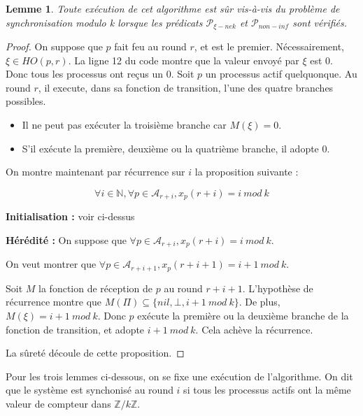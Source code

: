 \documentclass{article}
\newtheorem{lemma}{Lemme}
\begin{document}
\begin{lemma}
	Toute exécution de cet algorithme est sûr vis-à-vis du problème de synchronisation modulo k lorsque les prédicats $\mathcal{P}_{\xi-nek}$ et $\mathcal{P}_{non-inf}$ sont vérifiés.
\end{lemma}
\begin{proof}

	On suppose que $p$ fait feu au round $r$, et est le premier. Nécessairement, $\xi \in HO(p,r)$.
	La ligne 12 du code montre que la valeur envoyé par $\xi$ est 0.
	Donc tous les processus ont reçus un 0. Soit $p$ un processus actif quelquonque. Au round $r$, il execute, dans sa fonction de transition, l'une des quatre branches possibles.
	\begin{itemize}

		\item Il ne peut pas exécuter la troisième branche car $M(\xi) = 0$.
		\item S'il exécute la première, deuxième ou la quatrième branche, il adopte 0.

	\end{itemize}

	On montre maintenant par récurrence sur $i$ la proposition suivante :

	$$\forall i \in \mathds{N}, \forall p \in \mathcal{A}_{r+i}, x_p(r+i) = i~mod~k$$

	\textbf{Initialisation : } voir ci-dessus

	\textbf{Hérédité :}
	On suppose que $\forall p \in \mathcal{A}_{r+i}, x_p(r+i) = i~mod~k$.

	On veut montrer que $\forall p \in \mathcal{A}_{r+i+1}, x_p(r+i+1) = i+1~mod~k$.

	Soit $M$ la fonction de réception de $p$ au round $r+i+1$.
	L'hypothèse de récurrence montre que $M(\Pi) \subseteq \{nil, \bot, i+1~mod~k\}$.
	De plus, $M(\xi) = i+1~mod~k$. Donc $p$ exécute la première ou la deuxième branche de la fonction de transition, et adopte $i+1~mod~k$.
	Cela achève la récurrence.

	La sûreté découle de cette proposition.

\end{proof}

Pour les trois lemmes ci-dessous, on se fixe une exécution de l'algorithme.
On dit que le système est synchonisé au round $i$ si tous les processus actifs ont la même valeur de compteur dans $\mathds{Z}/k\mathds{Z}$.
\end{document}
